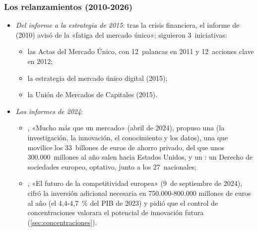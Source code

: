 \documentclass[11pt]{article}
\begin{document}
\begin{infografia}[H]
\centering
\caption{El mercado único en el tiempo: de Roma a la estrategia de 2025}\label{figu:linea-tiempo}
\end{infografia}

\subsubsection{Los relanzamientos (2010-2026)}\label{sec:relanzamientos}

\begin{itemize}
\item \emph{Del informe  a la estrategia de 2015}: tras la crisis financiera, el informe de  (2010) avisó de la «fatiga del mercado único»\nocite{Monti2010New}; siguieron 3~iniciativas:
  \begin{itemize}
  \item las Actas del Mercado Único, con 12~palancas en 2011 y 12~acciones clave en 2012\nocite{CE2011ActaMercadoUnico};
  \item la estrategia del mercado único digital (2015)\nocite{CE2015MercadoDigital};
  \item la Unión de Mercados de Capitales (2015)\nocite{CE2015UMC}.
  \end{itemize}
\item \emph{Los informes de 2024}:
  \begin{itemize}
  \item {}, «Mucho más que un mercado» (abril de 2024)\nocite{Letta2024Much}, propuso una  (la investigación, la innovación, el conocimiento y los datos), una  que movilice los 33~billones de euros de ahorro privado, del que unos 300.000~millones al año salen hacia Estados Unidos, y un : un Derecho de sociedades europeo, optativo, junto a los 27~nacionales;
  \item {}, «El futuro de la competitividad europea» (9~de septiembre de 2024)\nocite{Draghi2024Future}, cifró la inversión adicional necesaria en 750.000-800.000 millones de euros al año (el 4,4-4,7~\% del PIB de 2023) y pidió que el control de concentraciones valorara el potencial de innovación futura (\ref{sec:concentraciones}).
  \end{itemize}

\end{itemize}
\end{document}
